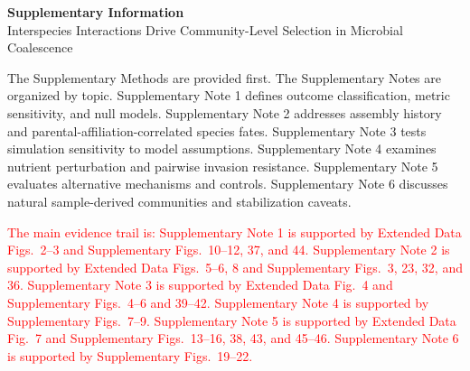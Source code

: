 \documentclass[11pt,a4paper]{article}
\newcommand{\rev}[1]{\textcolor{red}{#1}}
\begin{document}
\begin{center}
{\LARGE \textbf{Supplementary Information}}\\[1em]
{\large Interspecies Interactions Drive Community-Level Selection in Microbial Coalescence}\\[0.5em]
\end{center}


The Supplementary Methods are provided first. The Supplementary Notes are organized by topic. Supplementary Note 1 defines outcome classification, metric sensitivity, and null models. Supplementary Note 2 addresses assembly history and parental-affiliation-correlated species fates. Supplementary Note 3 tests simulation sensitivity to model assumptions. Supplementary Note 4 examines nutrient perturbation and pairwise invasion resistance. Supplementary Note 5 evaluates alternative mechanisms and controls. Supplementary Note 6 discusses natural sample-derived communities and stabilization caveats.

\rev{The main evidence trail is: Supplementary Note 1 is supported by Extended Data Figs.~2--3 and Supplementary Figs.~10--12, 37, and 44. Supplementary Note 2 is supported by Extended Data Figs.~5--6, 8 and Supplementary Figs.~3, 23, 32, and 36. Supplementary Note 3 is supported by Extended Data Fig.~4 and Supplementary Figs.~4--6 and 39--42. Supplementary Note 4 is supported by Supplementary Figs.~7--9. Supplementary Note 5 is supported by Extended Data Fig.~7 and Supplementary Figs.~13--16, 38, 43, and 45--46. Supplementary Note 6 is supported by Supplementary Figs.~19--22.}























\end{document}
